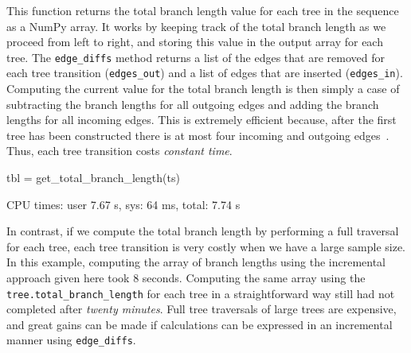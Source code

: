 \documentclass[graybox]{svmult}
\newcommand{\tskit}[0]{\texttt{tskit}}
\begin{document}
    This function returns the total branch length value for each tree in the
sequence as a NumPy array. It works by keeping track of the total branch
length as we proceed from left to right, and storing this value in the
output array for each tree. The \texttt{edge\_diffs} method returns a
list of the edges that are removed for each tree transition
(\texttt{edges\_out}) and a list of edges that are inserted
(\texttt{edges\_in}). Computing the current value for the total branch
length is then simply a case of subtracting the branch lengths for all
outgoing edges and adding the branch lengths for all incoming edges.
This is extremely efficient because, after the first tree has been
constructed there is at most four incoming and outgoing
edges~\citep{kelleher2016efficient}. Thus,
each tree transition costs \emph{constant time}.

\begin{pythoncode}
tbl = get_total_branch_length(ts)

CPU times: user 7.67 s, sys: 64 ms, total: 7.74 s
\end{pythoncode}

In contrast, if we compute the total branch length by performing a
full traversal for each tree, each tree transition is very costly
when we have a large sample size. In this example, computing the array of branch lengths
using the incremental approach given here took 8 seconds. Computing the
same array using the \texttt{tree.total\_branch\_length} for each tree
in a straightforward way still had not completed after \emph{twenty
minutes}.  Full tree traversals of large trees are
expensive, and great gains can be made if calculations can be expressed
in an incremental manner using \texttt{edge\_diffs}.



\end{document}
